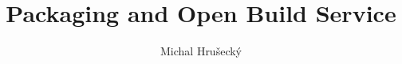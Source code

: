 \documentclass{beamer}
\author{Michal Hru\v{s}eck\'{y}}
\title{Packaging and Open Build Service}
\institute{openSUSE Team}
\begin{document}
\titlepage



\end{document}
